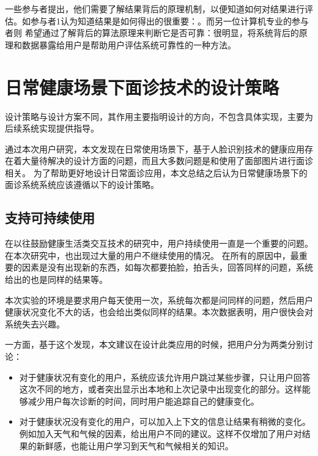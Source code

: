 一些参与者提出，他们需要了解结果背后的原理机制，以便知道如何对结果进行评估。如参与者1认为知道结果是如何得出的很重要：。而另一位计算机专业的参与者则
希望通过了解背后的算法原理来判断它是否可靠：很明显，将系统背后的原理和数据暴露给用户是帮助用户评估系统可靠性的一种方法。

\section{日常健康场景下面诊技术的设计策略}
设计策略与设计方案不同，其作用主要指明设计的方向，不包含具体实现，主要为后续系统实现提供指导。

通过本次用户研究，本文发现在日常使用场景下，基于人脸识别技术的健康应用存在着大量待解决的设计方面的问题，而且大多数问题是和使用了面部图片进行面诊相关。
为了帮助更好地设计日常面诊应用，本文总结之后认为日常健康场景下的面诊系统系统应该遵循以下的设计策略。

\subsection{支持可持续使用}
在以往鼓励健康生活类交互技术的研究中，用户持续使用一直是一个重要的问题\cite{Clawson2015No, Epstein2016Beyond}。在本次研究中，也出现过大量的用户不继续使用的情况。
在所有的原因中，最重要的因素是没有出现新的东西，如每次都要拍脸，拍舌头，回答同样的问题，系统给出的也是同样的结果等。

本次实验的环境是要求用户每天使用一次，系统每次都是问同样的问题，然后用户健康状况变化不大的话，也会给出类似同样的结果。本次数据表明，用户很快会对系统失去兴趣。

一方面，基于这个发现，本文建议在设计此类应用的时候，把用户分为两类分别讨论：
\begin{itemize}

    \item 对于健康状况有变化的用户，系统应该允许用户跳过某些步骤，只让用户回答这次不同的地方，或者突出显示出本地和上次记录中出现变化的部分。这样能够减少用户每次诊断的时间，同时用户能追踪自己的健康变化。

    \item 对于健康状况没有变化的用户，可以加入上下文的信息让结果有稍微的变化。例如加入天气和气候的因素，给出用户不同的建议。这样不仅增加了用户对结果的新鲜感，也能让用户学习到天气和气候相关的知识。

\end{itemize}

